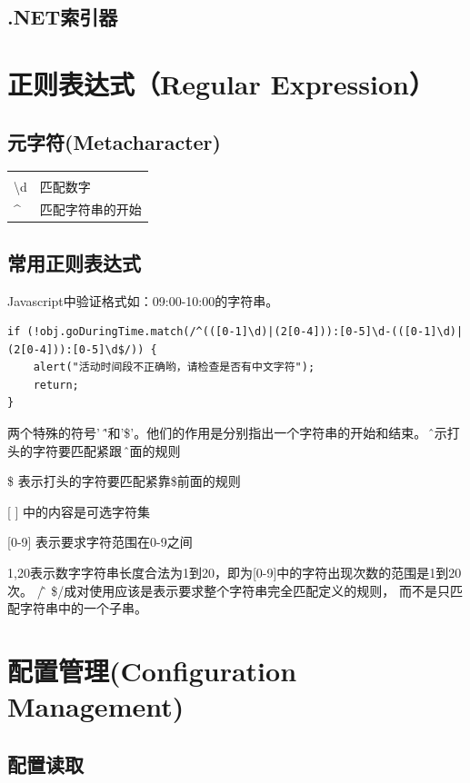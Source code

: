 \documentclass{book}
\begin{document}
\subsection{.NET索引器}

\section{正则表达式（Regular Expression）}

\subsection{元字符(Metacharacter)}

\begin{tabular}{ll}
	\multirow{1}{*}{}			
	& \multicolumn{1}{c}{}\\
	\textbackslash d & 匹配数字\\
	\^ & 匹配字符串的开始 \\ 					
\end{tabular}

\subsection{常用正则表达式}

Javascript中验证格式如：09:00-10:00的字符串。

\begin{lstlisting}[language={[Sharp]C}]
if (!obj.goDuringTime.match(/^(([0-1]\d)|(2[0-4])):[0-5]\d-(([0-1]\d)|(2[0-4])):[0-5]\d$/)) {
    alert("活动时间段不正确哟，请检查是否有中文字符");
    return;
}
\end{lstlisting}

两个特殊的符号' \^ '和'\$'。他们的作用是分别指出一个字符串的开始和结束。
\^ 表示打头的字符要匹配紧跟 \^后面的规则

\$ 表示打头的字符要匹配紧靠\$前面的规则

[ ] 中的内容是可选字符集

[0-9] 表示要求字符范围在0-9之间

{1,20}表示数字字符串长度合法为1到20，即为[0-9]中的字符出现次数的范围是1到20次。
/\^ 和 \$/成对使用应该是表示要求整个字符串完全匹配定义的规则，
而不是只匹配字符串中的一个子串。

\section{配置管理(Configuration Management)}

\subsection{配置读取}
\end{document}
